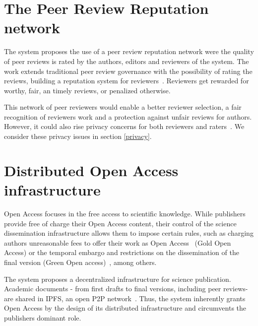 \section{The Peer Review Reputation network}
\label{reputation}

The system proposes the use of a peer review reputation network were the quality
of peer reviews is rated by the authors, editors and reviewers of the system.
The work extends traditional peer review governance with the possibility of
rating the reviews, building a reputation system for
reviewers~\cite{resnick2000reputation}. Reviewers get rewarded for worthy, fair,
an timely reviews, or penalized otherwise.

This network of peer reviewers would enable a better reviewer selection, a fair
recognition of reviewers work and a protection against unfair reviews for
authors. However, it could also rise privacy concerns for both reviewers and
raters~\cite{van1999effect,schaub2016trustless}. We consider these privacy
issues in section \ref{privacy}.


\section{Distributed Open Access infrastructure}
\label{distributedOA}
Open Access focuses in the free access to scientific knowledge. While publishers
provide free of charge their Open Access content, their control of the science
dissemination infrastructure allows them to impose certain rules, such as
charging authors unreasonable fees to offer their work as Open
Access~\cite{solomon2012study} (Gold Open Access) or the temporal embargo and
restrictions on the dissemination of the final version (Green Open
access)~\cite{bjork2014anatomy}, among others.

The system proposes a decentralized infrastructure for science publication.
Academic documents - from first drafts to final versions, including peer
reviews- are shared in IPFS, an open P2P network~\cite{benet_ipfs-content_2014}.
Thus, the system inherently grants Open Access by the design of its distributed
infrastructure and circumvents the publishers dominant role.

